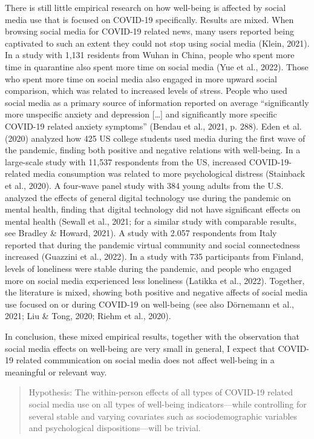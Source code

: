 \documentclass[
  man,floatsintext]{apa7}
\begin{document}
There is still little empirical research on how well-being is affected by social media use that is focused on COVID-19 specifically.
Results are mixed.
When browsing social media for COVID-19 related news, many users reported being captivated to such an extent they could not stop using social media (Klein, 2021).
In a study with 1,131 residents from Wuhan in China, people who spent more time in quarantine also spent more time on social media (Yue et al., 2022).
Those who spent more time on social media also engaged in more upward social comparison, which was related to increased levels of stress.
People who used social media as a primary source of information reported on average ``significantly more unspecific anxiety and depression {[}\ldots{]} and significantly more specific COVID-19 related anxiety symptoms'' (Bendau et al., 2021, p. 288).
Eden et al. (2020) analyzed how 425 US college students used media during the first wave of the pandemic, finding both positive and negative relations with well-being.
In a large-scale study with 11,537 respondents from the US, increased COVID-19-related media consumption was related to more psychological distress (Stainback et al., 2020).
A four-wave panel study with 384 young adults from the U.S. analyzed the effects of general digital technology use during the pandemic on mental health, finding that digital technology did not have significant effects on mental health (Sewall et al., 2021; for a similar study with comparable results, see Bradley \& Howard, 2021).
A study with 2.057 respondents from Italy reported that during the pandemic virtual community and social connectedness increased (Guazzini et al., 2022).
In a study with 735 participants from Finland, levels of loneliness were stable during the pandemic, and people who engaged more on social media experienced less loneliness (Latikka et al., 2022).
Together, the literature is mixed, showing both positive and negative affects of social media use focused on or during COVID-19 on well-being (see also Dörnemann et al., 2021; Liu \& Tong, 2020; Riehm et al., 2020).

In conclusion, these mixed empirical results, together with the observation that social media effects on well-being are very small in general, I expect that COVID-19 related communication on social media does not affect well-being in a meaningful or relevant way.

\begin{quote}
Hypothesis: The within-person effects of all types of COVID-19 related social media use on all types of well-being indicators---while controlling for several stable and varying covariates such as sociodemographic variables and psychological dispositions---will be trivial.
\end{quote}
\end{document}
